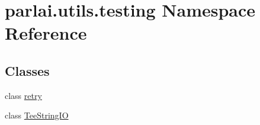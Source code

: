 \hypertarget{namespaceparlai_1_1utils_1_1testing}{}\section{parlai.\+utils.\+testing Namespace Reference}
\label{namespaceparlai_1_1utils_1_1testing}
\subsection*{Classes}
\begin{DoxyCompactItemize}
\item 
class \hyperlink{classparlai_1_1utils_1_1testing_1_1retry}{retry}
\item 
class \hyperlink{classparlai_1_1utils_1_1testing_1_1TeeStringIO}{Tee\+String\+IO}
\end{DoxyCompactItemize}
